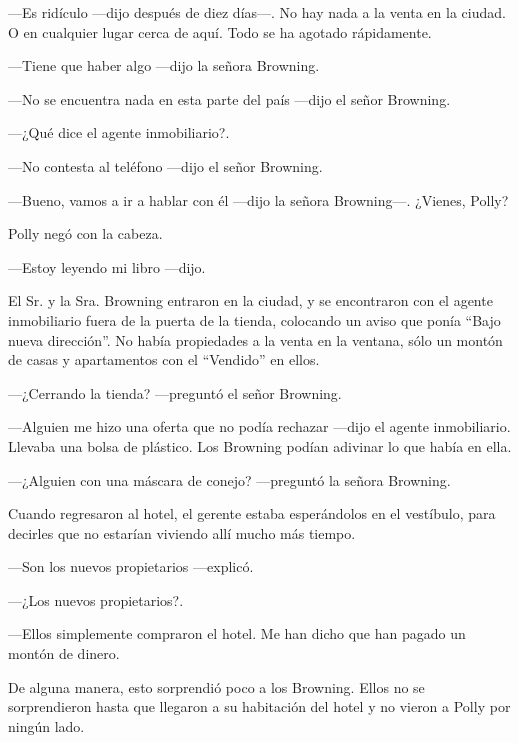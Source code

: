 ---Es ridículo ---dijo después de diez días---. No hay nada a la venta en la ciudad. O en cualquier lugar cerca de aquí. Todo se ha agotado rápidamente.

---Tiene que haber algo ---dijo la señora Browning.

---No se encuentra nada en esta parte del país ---dijo el señor Browning.

---¿Qué dice el agente inmobiliario?.

---No contesta al teléfono ---dijo el señor Browning.

---Bueno, vamos a ir a hablar con él ---dijo la señora Browning---. ¿Vienes, Polly?

Polly negó con la cabeza.

---Estoy leyendo mi libro ---dijo.

El Sr. y la Sra. Browning entraron en la ciudad, y se encontraron con el agente inmobiliario fuera de la puerta de la tienda, colocando un aviso que ponía ``Bajo nueva dirección''. No había propiedades a la venta en la ventana, sólo un montón de casas y apartamentos con el ``Vendido'' en ellos.

---¿Cerrando la tienda? ---preguntó el señor Browning.

---Alguien me hizo una oferta que no podía rechazar ---dijo el agente inmobiliario. Llevaba una bolsa de plástico. Los Browning podían adivinar lo que había en ella.

---¿Alguien con una máscara de conejo? ---preguntó la señora Browning.

Cuando regresaron al hotel, el gerente estaba esperándolos en el vestíbulo, para decirles que no estarían viviendo allí mucho más tiempo.

---Son los nuevos propietarios ---explicó.

---¿Los nuevos propietarios?.

---Ellos simplemente compraron el hotel. Me han dicho que han pagado un montón de dinero.

De alguna manera, esto sorprendió poco a los Browning. Ellos no se sorprendieron hasta que llegaron a su habitación del hotel y no vieron a Polly por ningún lado.

